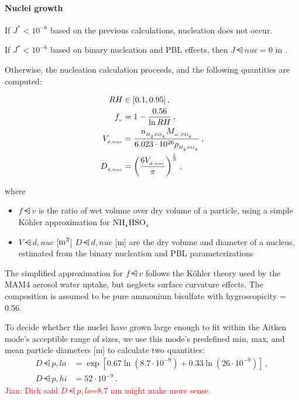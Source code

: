 \paragraph{Nuclei growth} 

If $J^* < 10^{-6}$ based on the previous calculations, nucleation does not
occur.

\begin{assume}
  If $J^* < 10^{-6}$ based on binary nucleation and PBL effects, then
  $J\dsub{nuc} = 0$ in .
\end{assume}

Otherwise, the nucleation calculation proceeds, and the following quantities are
computed:

\begin{align}
  RH &\in [0.1, 0.95] \,, \\
  f_{_{v}} &= 1 - \frac{0.56}{\ln RH} \,, \\
  V_{_{d,nuc}} &= \frac{n_{_{H_{_2}SO_{_4}}} M_{_{w,SO_{_4}}}}
                   {6.023 \cdot 10^{26} \rho_{_{H_{_2}SO_{_4}}}} \,, \\
  D_{_{d,nuc}} &= \left( \frac{6 V_{_{d,nuc}}}{\pi} \right)^{\frac{1}{3}} \,,
\end{align}

where

\begin{itemize}
  \item $f\dsub{v}$ is the ratio of wet volume over dry volume of a particle,
        using a simple K\"ohler approximation for $\rm NH_{_{4}}HSO_{_{4}}$
  \item $V\dsub{d,nuc}$ [$\rm m^3$] $D\dsub{d,nuc}$ [m] are the dry volume and
        diameter of a nucleus, estimated from the binary nucleation and PBL
        parameterizations
\end{itemize}

The simplified approximation for $f\dsub{v}$ follows the K\"ohler theory used by
the MAM4 aerosol water uptake, but neglects surface curvature effects. The
composition is assumed to be pure ammonium bisulfate with hygroscopicity = 0.56.

To decide whether the nuclei have grown large enough to fit within the Aitken
mode's acceptible range of sizes, we use this mode's predefined min, max, and
mean particle diameters [m] to calculate two quantities:
\begin{align}
  D\dsub{p,lo} &= \exp \left[ 0.67 \ln (8.7 \cdot 10^{-9}) +
                            0.33 \ln (26 \cdot 10^{-9}) \right] \,, \\   %
  D\dsub{p,hi} &= 52 \cdot 10^{-9} \,.
\end{align}
\textcolor{red}{Jian: Dick said $D\dsub{p,lo}$=8.7 nm might make more sense.}

